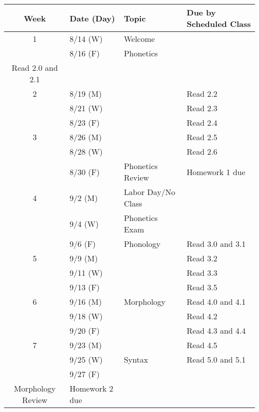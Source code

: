 \documentclass{article}
\makeatletter
\newcommand{\cellbreak}[2]{
    \begin{tabular}[t]{@{}l@{}}
      #1\\
      #2
    \end{tabular}}
\newcommand{\rowvspace}{\rule{0pt}{14pt}}
\makeatother
\begin{document}
    \begin{longtable}{c l l l}
      Week  & Date (Day)  & Topic                           & Due by Scheduled Class\\
      \hline
      1     & 8/14 (W)    & Welcome \rowvspace              & \\
            & 8/16 (F)    & Phonetics                       & \cellbreak{Homework 0 due}
                                                                        {Read 2.0 and 2.1}\\
      2     & 8/19 (M)    &                                 & Read 2.2\\
            & 8/21 (W)    &                                 & Read 2.3\\
            & 8/23 (F)    &                                 & Read 2.4\\
      3     & 8/26 (M)    &                                 & Read 2.5\\
            & 8/28 (W)    &                                 & Read 2.6\\
            & 8/30 (F)    & Phonetics Review                & Homework 1 due\\
      4     & 9/2 (M)     & Labor Day/No Class              & \\
            & 9/4 (W)     & Phonetics Exam                  & \\
            & 9/6 (F)     & Phonology                       & Read 3.0 and 3.1\\
      5     & 9/9 (M)     &                                 & Read 3.2\\
            & 9/11 (W)    &                                 & Read 3.3\\
            & 9/13 (F)    &                                 & Read 3.5\\
      6     & 9/16 (M)    & Morphology                      & Read 4.0 and 4.1\\
            & 9/18 (W)    &                                 & Read 4.2\\
            & 9/20 (F)    &                                 & Read 4.3 and 4.4\\
      7     & 9/23 (M)    &                                 & Read 4.5\\
            & 9/25 (W)    & Syntax                          & Read 5.0 and 5.1\\
            & 9/27 (F)    & \cellbreak{Phonology \&}
                                      {Morphology Review}   & Homework 2 due\\

\end{longtable}
\end{document}
